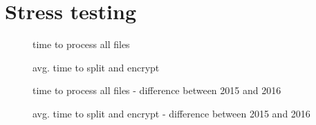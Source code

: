 \section{Stress testing}

\begin{figure}[h]
\centering

\caption{time to process all files}
\end{figure}

\begin{figure}[h]
\centering

\caption{avg. time to split and encrypt}
\end{figure}

\begin{figure}[h]
\centering

\caption{time to process all files - difference between 2015 and 2016}
\end{figure}

\begin{figure}[h]
\centering

\caption{avg. time to split and encrypt - difference between 2015 and 2016}
\end{figure}